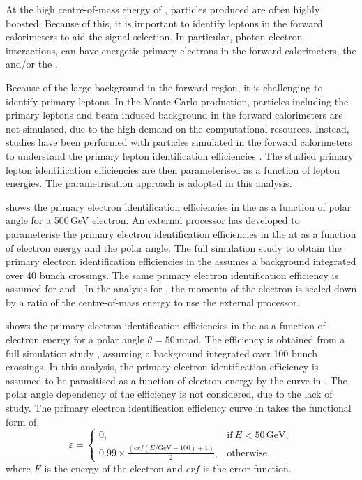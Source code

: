 At the high centre-of-mass energy of \CLIC, particles produced are often highly boosted.  Because of this, it is important to identify leptons in the forward calorimeters to aid the signal selection. In particular, photon-electron interactions, can have energetic primary  electrons in  the forward calorimeters, the \LumiCAL and/or the \BeamCAL.

Because of the large background in the forward region, it is challenging to identify primary leptons. In the Monte Carlo production, particles including the primary leptons and beam induced background in the forward calorimeters are not simulated, due to the high demand on the computational resources. Instead, studies have been performed with particles simulated in the forward calorimeters to understand the primary lepton identification efficiencies \cite{sailer2012radiation,Sailer:2017onh,Lukic:forwardElectron}. The studied  primary lepton identification efficiencies are then parameterised as a function of lepton energies. The parametrisation approach is adopted in this analysis.

 shows the primary electron identification efficiencies in the \BeamCAL as a function of polar angle for a 500\,GeV electron.  An external processor \cite{Sailer:2017onh} has developed to parameterise the primary electron identification efficiencies in the \BeamCAL at  as a function of electron energy and the polar angle. The full simulation study to obtain the primary electron identification efficiencies in the \BeamCAL assumes a background integrated over 40 bunch crossings.  The same primary electron identification efficiency is assumed for  and . In the analysis for , the momenta of the electron is scaled down by a ratio of the centre-of-mass energy to use the external processor.

 shows the primary electron identification efficiencies in the \LumiCAL as a function of electron energy for a polar angle $\theta = 50$\,mrad. The efficiency is obtained from a full simulation study \cite{Lukic:forwardElectron}, assuming a background integrated over 100 bunch crossings. In this analysis, the primary electron identification efficiency is assumed to be parasitised as a function of electron energy by the curve in . The polar angle dependency of the efficiency is not considered, due to the lack of study. The primary electron identification efficiency curve in  takes the functional form of:
\begin{equation}
\varepsilon=
\begin{cases}
  0, & \text{if}\ E < 50\,\text{GeV},\\
  0.99 \times \frac{(erf(E / \text{GeV} - 100) + 1 )}{2}, & \text{otherwise},
\end{cases}
\end{equation}
where $E$ is the energy of the electron and $erf$ is the error function.

